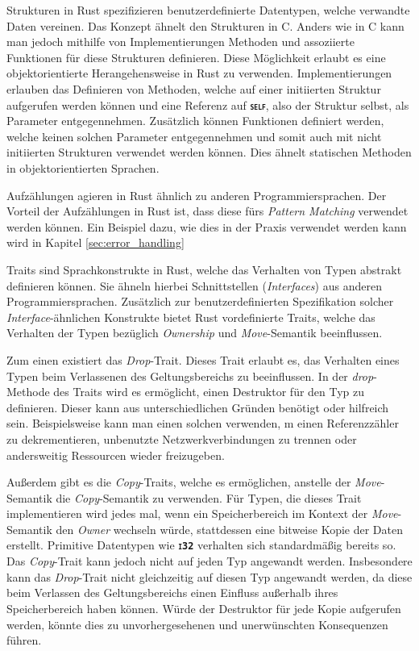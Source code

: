 Strukturen in Rust spezifizieren benutzerdefinierte Datentypen, welche verwandte Daten vereinen. Das Konzept
ähnelt den Strukturen in C. Anders wie in C kann man jedoch mithilfe von Implementierungen Methoden und assoziierte
Funktionen für diese Strukturen definieren.
Diese Möglichkeit erlaubt es eine objektorientierte Herangehensweise in Rust zu verwenden.
Implementierungen erlauben das Definieren von Methoden, welche auf einer initiierten Struktur aufgerufen werden 
können und eine Referenz auf \texttt{\textsc{\textbf{self}}}, also der Struktur selbst, als Parameter entgegennehmen.
Zusätzlich können Funktionen definiert werden, welche keinen solchen Parameter entgegennehmen und somit auch mit
nicht initiierten Strukturen verwendet werden können. Dies ähnelt statischen Methoden in objektorientierten
Sprachen.\cite{rustBook}

Aufzählungen agieren in Rust ähnlich zu anderen Programmiersprachen. Der Vorteil der Aufzählungen in Rust ist, dass
diese fürs \textit{Pattern Matching} verwendet werden können. Ein Beispiel dazu, wie dies in der Praxis verwendet
werden kann wird in Kapitel \ref{sec:error_handling}
\cite{rustBook}

Traits sind Sprachkonstrukte in Rust, welche das Verhalten von Typen abstrakt definieren können. Sie ähneln 
hierbei Schnittstellen (\textit{Interfaces}) aus anderen Programmiersprachen.
Zusätzlich zur benutzerdefinierten Spezifikation
solcher \textit{Interface}-ähnlichen Konstrukte bietet Rust vordefinierte Traits, welche das Verhalten der Typen
bezüglich \textit{Ownership} und \textit{Move}-Semantik beeinflussen.\cite{rustBook}

Zum einen existiert das \textit{Drop}-Trait. Dieses Trait erlaubt es, das Verhalten eines Typen beim Verlassenen des
Geltungsbereichs zu beeinflussen. In der \textit{drop}-Methode des Traits wird es ermöglicht, einen Destruktor
für den Typ zu definieren. Dieser kann aus unterschiedlichen Gründen benötigt oder hilfreich sein.
Beispielsweise kann man einen solchen verwenden, 
m einen Referenzzähler zu dekrementieren, unbenutzte Netzwerkverbindungen
zu trennen oder andersweitig Ressourcen wieder freizugeben.\cite{rustBook}

Außerdem gibt es die \textit{Copy}-Traits, welche es ermöglichen, anstelle der \textit{Move}-Semantik die
\textit{Copy}-Semantik zu verwenden. Für Typen, die dieses Trait implementieren wird jedes mal, wenn ein
Speicherbereich im Kontext der \textit{Move}-Semantik den \textit{Owner} wechseln würde,
stattdessen eine bitweise Kopie der Daten erstellt. Primitive Datentypen wie \texttt{\textsc{\textbf{i32}}}
verhalten sich standardmäßig bereits so. Das \textit{Copy}-Trait kann jedoch nicht auf jeden Typ
angewandt werden. Insbesondere kann das \textit{Drop}-Trait nicht gleichzeitig auf diesen Typ angewandt werden,
da diese beim Verlassen des Geltungsbereichs einen Einfluss außerhalb ihres Speicherbereich haben können.
Würde der Destruktor für jede Kopie aufgerufen werden, könnte dies zu unvorhergesehenen und
unerwünschten Konsequenzen führen.\cite{rustBook}\cite{rustDocCopy}

